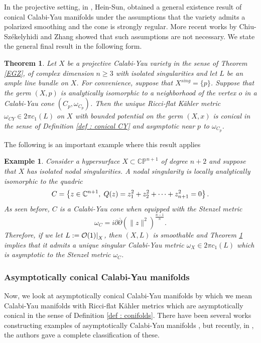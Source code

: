 \documentclass[a4paper,11pt]{article}
\newcounter{mythm}[section]
\newtheorem{tm}[mythm]{Theorem}
\newtheorem{ex}[mythm]{Example}
\def\C{\mathbb{C}}
\newcommand\restr[2]{{%
  \left.\kern-\nulldelimiterspace %
  #1 %
  \littletaller %
  \right|_{#2} %
  }}
\newcommand{\littletaller}{\mathchoice{\vphantom{\big|}}{}{}{}}
\begin{document}
In the projective setting, in \cite{hein_calabi-yau_2017}, Hein-Sun, obtained a general existence result of conical Calabi-Yau manifolds under the assumptions that the variety admits a polarized smoothing and the cone is strongly regular. More recent works by Chiu-Székelyhidi \cite{ChiuSzekelyhidi} and Zhang \cite{zhang2024polynomial} showed that such assumptions are not necessary. We state the general final result in the following form.
\begin{tm} \label{HS}
Let $X$ be a projective Calabi-Yau variety in the sense of Theorem \ref{EGZ}, of complex dimension $n \geq 3$ with isolated singularities and let $L$ be an ample line bundle on $X$. For convenience, suppose that $X^{sing} = \{ p\}$. Suppose that the germ $(X,p)$ is analytically isomorphic to a neighborhood of the vertex $o$ in a Calabi-Yau cone $(C_p, \omega_{C_p})$. Then the unique Ricci-flat Kähler metric $\omega_{CY} \in 2 \pi c_1(L)$ on $X$ with bounded potential on the germ $(X,x)$ is conical in the sense of Definition \ref{def : conical CY} and asymptotic near $p$ to $\omega_{C_p}$.
\end{tm}
The following is an important example where this result applies  
\begin{ex} \label{ODP}
    Consider a hypersurface $X \subset \mathbb{CP}^{n+1}$ of degree $n+2$ and suppose that $X$ has isolated nodal singularities. A nodal singularity is locally analytically isomorphic to the quadric
\[
C = \left\{ z \in \C^{n+1}, \hspace{0.1cm} Q(z)= z_1^2 + z_2^2 + \cdots + z_{n+1}^2 = 0 \right\}.
\]
As seen before, $C$ is a Calabi-Yau cone when equipped with the Stenzel metric \cite{stenzel_ricci-flat_1993}
$$
\omega_{C} = i \partial \overline{\partial} \left( \| z\|^2 \right)^{\frac{n-1}{n}}.
$$
Therefore, if we let $L : = \restr{\mathcal{O}(1)}{X}$, then $(X,L)$ is smoothable and Theorem \ref{HS} implies that it admits a unique singular Calabi-Yau metric $\omega_X \in 2 \pi c_1(L)$ which is asymptotic to the Stenzel metric $\omega_C$.
\end{ex}

\subsubsection*{Asymptotically conical Calabi-Yau manifolds}
Now, we look at asymptotically conical Calabi-Yau manifolds by which we mean Calabi-Yau manifolds with Ricci-flat Kähler metrics which are asymptotically conical in the sense of Definition \ref{def : conifolds}. There have been several works constructing examples of asymptotically Calabi-Yau manifolds \cite{goto_calabi-yau_2012,van_coevering_ricci-flat_2010, van2011examples, conlon2013asymptotically, conlon2015asymptotically, Tian_Yau1991}, but recently, in \cite{conlon_classification_2024}, the authors gave a complete classification of these.\\
\end{document}
